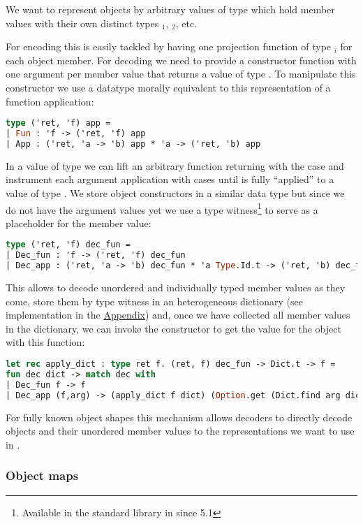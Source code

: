 \documentclass[nolinenum]{jfp}
\begin{document}
We want to represent \json{} objects by arbitrary \ml{} values of type
 which hold member values with their own distinct types
$_1$, $_2$, etc.

For encoding this is easily tackled by having one projection function
of type $_i$ for each object member. For decoding we
need to provide a constructor function with one argument per member
value that returns a value of type . To manipulate this
constructor we use a datatype morally equivalent to this
representation of a function application:
\pagebreak
\begin{lstlisting}[language=ocaml]
type ('ret, 'f) app =
| Fun : 'f -> ('ret, 'f) app
| App : ('ret, 'a -> 'b) app * 'a -> ('ret, 'b) app
\end{lstlisting}
%
In a value of type  we can lift an arbitrary function
 returning  with the  case and instrument
each argument application with  cases until  is
fully ``applied'' to a value of type  .
We store object constructors in a similar data type but since we do not
have the argument values yet we use a type witness\footnote{Available
in the \ocaml{} standard library in  since \ocaml{} 5.1}
to serve as a placeholder for the member value:
%
\begin{lstlisting}[language=ocaml]
type ('ret, 'f) dec_fun =
| Dec_fun : 'f -> ('ret, 'f) dec_fun
| Dec_app : ('ret, 'a -> 'b) dec_fun * 'a Type.Id.t -> ('ret, 'b) dec_fun
\end{lstlisting}
%
This allows to decode unordered and individually typed member values
as they come, store them by type witness in an heterogeneous
dictionary  (see implementation in the
\hyperref[sec:appendix]{Appendix}) and, once we have collected all
member values in the dictionary, we can invoke the constructor to get
the \ml{} value for the object with this function:
%
\begin{lstlisting}[language=ocaml]
let rec apply_dict : type ret f. (ret, f) dec_fun -> Dict.t -> f =
fun dec dict -> match dec with
| Dec_fun f -> f
| Dec_app (f,arg) -> (apply_dict f dict) (Option.get (Dict.find arg dict))
\end{lstlisting}
%
For fully known object shapes this mechanism allows decoders to
directly decode objects and their unordered member values to the
representations we want to use in \ml{}.

\subsubsection{Object maps}
\label{sec:obj_map}
\end{document}
